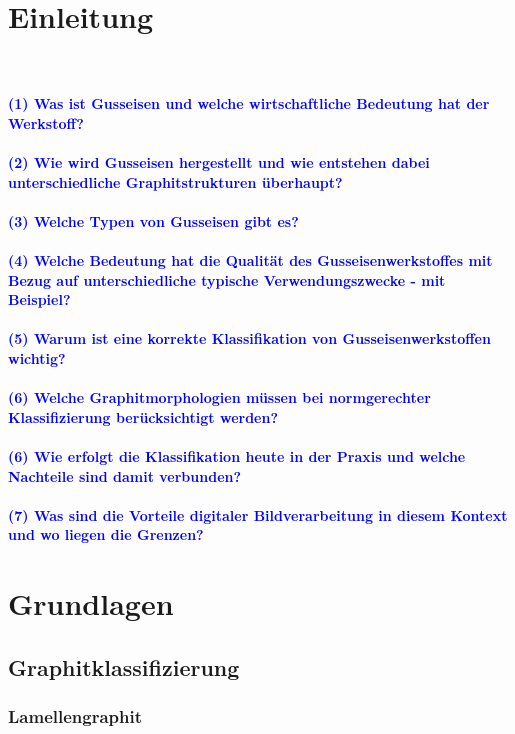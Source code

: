 \documentclass[
fontsize=10pt, 
listof = totoc,
parskip = half	
]{report}
\begin{document}
\chapter{Einleitung}
\label{ch:Einleitung}

\\\\
\textcolor{blue}{\textbf{(1) Was ist Gusseisen und welche wirtschaftliche Bedeutung hat der Werkstoff?}}
\\\\
\textcolor{blue}{\textbf{(2) Wie wird Gusseisen hergestellt und wie entstehen dabei unterschiedliche Graphitstrukturen überhaupt?}}
\\\\
\textcolor{blue}{\textbf{(3) Welche Typen von Gusseisen gibt es?}}
\\\\
\textcolor{blue}{\textbf{(4) Welche Bedeutung hat die Qualität des Gusseisenwerkstoffes mit Bezug auf unterschiedliche typische Verwendungszwecke - mit Beispiel?}}
\\\\
\textcolor{blue}{\textbf{(5) Warum ist eine korrekte Klassifikation von Gusseisenwerkstoffen wichtig?}}
\\\\
\textcolor{blue}{\textbf{(6) Welche Graphitmorphologien müssen bei normgerechter Klassifizierung berücksichtigt werden?}}
\\\\
\textcolor{blue}{\textbf{(6) Wie erfolgt die Klassifikation heute in der Praxis und welche Nachteile sind damit verbunden?}}
\\\\
\textcolor{blue}{\textbf{(7) Was sind die Vorteile digitaler Bildverarbeitung in diesem Kontext und wo liegen die Grenzen?}}

\newpage

\chapter{Grundlagen}
\label{ch:Grundlagen}

\section{Graphitklassifizierung}
\label{sec:Graphitklassifizierung}

\subsection{Lamellengraphit}
\label{subsec:Lamellengraphit}
\end{document}
